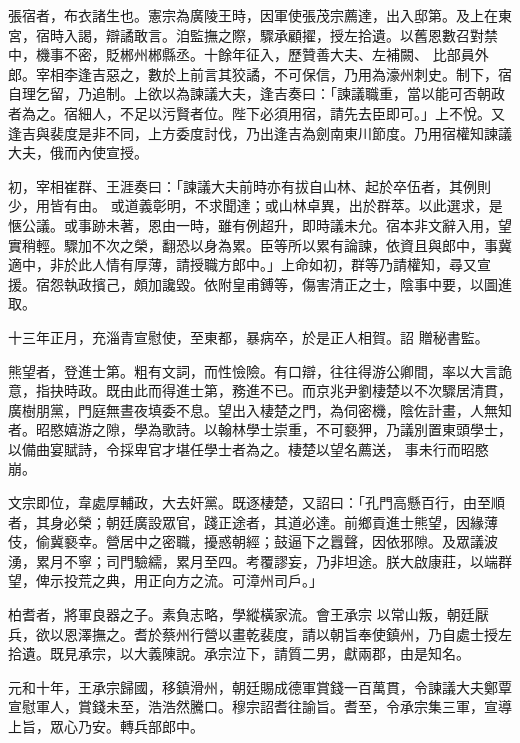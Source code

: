\begin{pinyinscope}
 張宿者，布衣諸生也。憲宗為廣陵王時，因軍使張茂宗薦達，出入邸第。及上在東宮，宿時入謁，辯譎敢言。洎監撫之際，驟承顧擢，授左拾遺。以舊恩數召對禁中，機事不密，貶郴州郴縣丞。十餘年征入，歷贊善大夫、左補闕、
 比部員外郎。宰相李逢吉惡之，數於上前言其狡譎，不可保信，乃用為濠州刺史。制下，宿自理乞留，乃追制。上欲以為諫議大夫，逢吉奏曰：「諫議職重，當以能可否朝政者為之。宿細人，不足以污賢者位。陛下必須用宿，請先去臣即可。」上不悅。又逢吉與裴度是非不同，上方委度討伐，乃出逢吉為劍南東川節度。乃用宿權知諫議大夫，俄而內使宣授。



 初，宰相崔群、王涯奏曰：「諫議大夫前時亦有拔自山林、起於卒伍者，其例則少，用皆有由。
 或道義彰明，不求聞達；或山林卓異，出於群萃。以此選求，是愜公議。或事跡未著，恩由一時，雖有例超升，即時議未允。宿本非文辭入用，望實稍輕。驟加不次之榮，翻恐以身為累。臣等所以累有論諫，依資且與郎中，事冀適中，非於此人情有厚薄，請授職方郎中。」上命如初，群等乃請權知，尋又宣援。宿怨執政擯己，頗加讒毀。依附皇甫鎛等，傷害清正之士，陰事中要，以圖進取。



 十三年正月，充淄青宣慰使，至東都，暴病卒，於是正人相賀。詔
 贈秘書監。



 熊望者，登進士第。粗有文詞，而性憸險。有口辯，往往得游公卿間，率以大言詭意，指抉時政。既由此而得進士第，務進不已。而京兆尹劉棲楚以不次驟居清貫，廣樹朋黨，門庭無晝夜填委不息。望出入棲楚之門，為伺密機，陰佐計畫，人無知者。昭愍嬉游之隙，學為歌詩。以翰林學士崇重，不可褻狎，乃議別置東頭學士，以備曲宴賦詩，令採卑官才堪任學士者為之。棲楚以望名薦送，
 事未行而昭愍崩。



 文宗即位，韋處厚輔政，大去奸黨。既逐棲楚，又詔曰：「孔門高懸百行，由至順者，其身必榮；朝廷廣設眾官，踐正途者，其道必達。前鄉貢進士熊望，因緣薄伎，偷冀褻幸。營居中之密職，擾惑朝經；鼓逼下之囂聲，因依邪隙。及眾議波湧，累月不寧；司門驗繻，累月至四。考覆謬妄，乃非坦途。朕大啟康莊，以端群望，俾示投荒之典，用正向方之流。可漳州司戶。」



 柏耆者，將軍良器之子。素負志略，學縱橫家流。會王承宗
 以常山叛，朝廷厭兵，欲以恩澤撫之。耆於蔡州行營以畫乾裴度，請以朝旨奉使鎮州，乃自處士授左拾遺。既見承宗，以大義陳說。承宗泣下，請質二男，獻兩郡，由是知名。



 元和十年，王承宗歸國，移鎮滑州，朝廷賜成德軍賞錢一百萬貫，令諫議大夫鄭覃宣慰軍人，賞錢未至，浩浩然騰口。穆宗詔耆往諭旨。耆至，令承宗集三軍，宣導上旨，眾心乃安。轉兵部郎中。




\end{pinyinscope}
